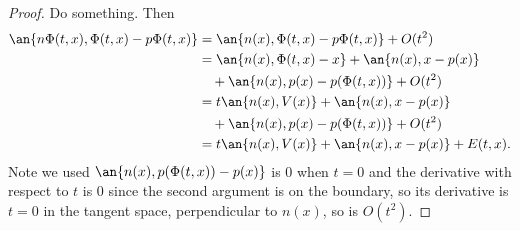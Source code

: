 \begin{proof}
%
Do something. Then
\begin{align*}
\an{n\Phi(t,x),\Phi(t,x)-p\Phi(t,x)}
&=\an{n(x),\Phi(t,x)-p\Phi(t,x)}+O(t^2)\\
&=\an{n(x),\Phi(t,x)-x}+\an{n(x), x-p(x)}\\
&\quad+\an{n(x),p(x)-p(\Phi(t,x))}+O(t^2)\\
&=t\an{n(x), V(x)}+\an{n(x), x-p(x)}\\
&\quad+\an{n(x),p(x)-p(\Phi(t,x))}+O(t^2)\\
&=t\an{n(x), V(x)}+\an{n(x),x-p(x)}+E(t,x).
\end{align*}
Note we used $\an{n(x),p(\Phi(t,x))-p(x)}$ is 0 when $t=0$ and the derivative with respect to $t$ is $0$ since the second argument is on the boundary, so its derivative is $t=0$ in the tangent space, perpendicular to $n(x)$, so is $O(t^2)$.
\end{proof}
